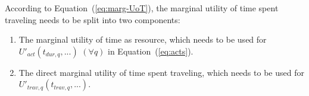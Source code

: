 According to Equation~(\ref{eq:marg-UoT}), the marginal utility of time spent traveling needs to be split into two components:
%
\begin{enumerate}\styleEnumerate
%
\item The marginal utility of time as resource, which needs to be used for $U'_{act}(t_{dur,q},...)$ $(\forall q)$ in Equation~(\ref{eq:acts}).
%
\item The {direct marginal utility of time spent traveling}, which needs to be used for $U'_{trav,q}(t_{trav,q},...)$.
%
\end{enumerate}
%

